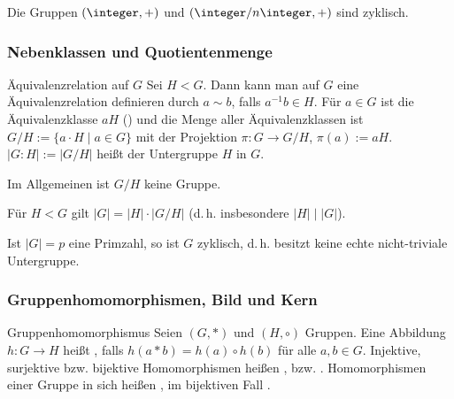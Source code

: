 \begin{Bsp}
    Die Gruppen $(\integer, +)$ und $(\integer/n\integer, +)$ sind zyklisch.
\end{Bsp}

\pagebreak

\subsubsection{%
    Nebenklassen und Quotientenmenge%
}

\begin{Def}{Äquivalenzrelation auf $G$}
    Sei $H < G$.
    Dann kann man auf $G$ eine Äquivalenzrelation definieren durch
    $a \sim b$, falls $a^{-1} b \in H$.
    Für $a \in G$ ist die Äquivalenzklasse $aH$ ()
    und die Menge aller Äquivalenzklassen ist
    $G/H := \{a \cdot H \;|\; a \in G\}$ mit der
    Projektion $\pi\colon G \rightarrow G/H$, $\pi(a) := aH$.
    $|G : H| := |G/H|$ heißt  der Untergruppe $H$ in $G$.
\end{Def}

\begin{Bem}
    Im Allgemeinen ist $G/H$ keine Gruppe.
\end{Bem}

\linie

\begin{Satz}{}
    Für $H < G$ gilt $|G| = |H| \cdot |G/H|$
    (d.\,h. insbesondere $|H| \;|\; |G|$).
\end{Satz}

\begin{Kor}
    Ist $|G| = p$ eine Primzahl, so ist $G$ zyklisch, d.\,h.
    besitzt keine echte nicht-triviale Untergruppe.
\end{Kor}

\subsubsection{%
    Gruppenhomomorphismen, Bild und Kern%
}

\begin{Def}{Gruppenhomomorphismus}
    Seien $(G, \ast)$ und $(H, \circ)$ Gruppen.
    Eine Abbildung $h\colon G \rightarrow H$ heißt ,
    falls $h(a \ast b) = h(a) \circ h(b)$ für alle $a, b \in G$.
    Injektive, surjektive bzw. bijektive Homomorphismen heißen
    ,  bzw.
    .
    Homomorphismen einer Gruppe in sich heißen ,
    im bijektiven Fall .
\end{Def}


